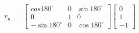 \documentclass[preview]{standalone}
\begin{document}
\begin{align*}
v_y\ =\ \begin{bmatrix}
                        cos180^\circ & 0 & \sin180^\circ\\
                        0 & 1 & 0 \\
                        -\sin180^\circ & 0 & \cos180^\circ
                        \end{bmatrix}\begin{bmatrix}
                        0\\
                        1\\
                        -1
                        \end{bmatrix}\\
\end{align*}
\end{document}
